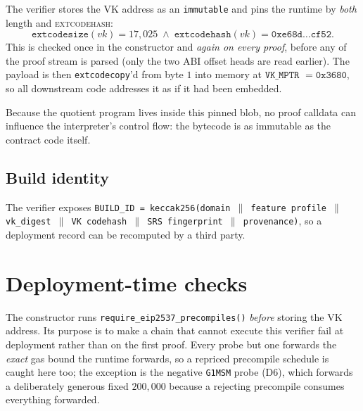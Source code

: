 \documentclass[11pt,a4paper]{article}
\newcommand{\code}[1]{\texttt{#1}}
\newcommand{\mptr}[1]{\texttt{#1}}
\newcommand{\opc}[1]{\textsc{#1}}
\theoremstyle{definition}
\begin{document}
The verifier stores the VK address as an \code{immutable} and pins the runtime
by \emph{both} length and \opc{extcodehash}:
\[
\code{extcodesize}(vk) = 17{,}025
\;\wedge\;
\code{extcodehash}(vk) = \mathtt{0xe68d\ldots cf52}.
\]
This is checked once in the constructor and \emph{again on every proof},
before any of the proof stream is parsed (only the two ABI offset heads are
read earlier). The payload is then
\code{extcodecopy}'d from byte $1$ into memory at $\mptr{VK\_MPTR}$
$=\mathtt{0x3680}$, so all downstream code addresses it as if it had been
embedded.

Because the quotient program lives inside this pinned blob, no proof calldata
can influence the interpreter's control flow: the bytecode is as immutable as
the contract code itself.

\subsection{Build identity}

The verifier exposes
\code{BUILD\_ID = keccak256(domain $\|$ feature profile $\|$ vk\_digest $\|$
VK codehash $\|$ SRS fingerprint $\|$ provenance)}, so a deployment record can
be recomputed by a third party.

\section{Deployment-time checks}
\label{sec:deploy}

The constructor runs \code{require\_eip2537\_precompiles()} \emph{before}
storing the VK address. Its purpose is to make a chain that cannot execute
this verifier fail at deployment rather than on the first proof. Every probe
but one forwards the \emph{exact} gas bound the runtime forwards, so a
repriced precompile schedule is caught here too; the exception is the negative
\code{G1MSM} probe (D6), which forwards a deliberately generous fixed
$200{,}000$ because a rejecting precompile consumes everything forwarded.
\end{document}
